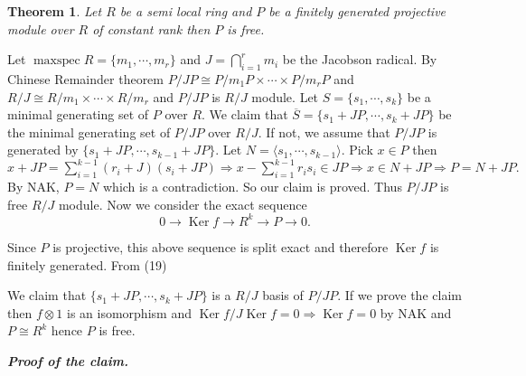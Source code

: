 \documentclass[11pt]{amsart}
\newtheorem{theorem}{Theorem}[section]
\newcommand\isom{\mathrel{\stackon[-0.1ex]{\makebox*{\scalebox{1.08}{\AC}}{=\hfill\llap{=}}}{{\AC}}}}
\newcommand\nvisom{\rotatebox[origin=cc] {-90}{$ \isom $}}
\newcommand{\gen}[1]{\langle#1\rangle}
\DeclareMathOperator{\Ker}{\text{Ker}}
\DeclareMathOperator{\mspec}{\text{maxspec}}
\begin{document}
\begin{theorem}

Let $R$ be a semi local ring and $P$ be a finitely generated projective module over $R$ of constant rank then $P$ is free.

\end{theorem}

\proof Let $\mspec R=\{m_1,\cdots, m_r\}$ and $J=\displaystyle\bigcap_{i=1}^r m_i$ be the Jacobson radical. By Chinese Remainder theorem $P/JP\cong P/m_1P\times\cdots\times P/m_rP$ and $R/J\cong R/m_1\times\cdots\times R/m_r$ and $P/JP$ is $R/J$ module. Let $S=\{s_1,\cdots,s_k\}$ be a minimal generating set of $P$ over $R$. We claim that $\overline{S}=\{s_1+JP,\cdots,s_k+JP\}$ be the minimal generating set of $P/JP$ over $R/J.$ If not, we assume that $P/JP$ is generated by $\{s_1+JP,\cdots,s_{k-1}+JP\}$. Let $N=\gen{s_1,\cdots,s_{k-1}}.$  Pick $x\in P$ then $x+JP=\displaystyle\sum_{i=1}^{k-1} (r_i+J)(s_i+JP) \Rightarrow x-\displaystyle\sum_{i=1}^{k-1} r_is_i\in JP \Rightarrow x\in N+JP \Rightarrow P=N+JP.$ By NAK, $P=N$ which is a contradiction. So our claim is proved. Thus $P/JP$ is free $R/J$ module. Now we consider the exact sequence \begin{equation}
0\to \Ker f\to R^k\to P\to 0.
\end{equation}

Since $P$ is projective, this above sequence is split exact and therefore $\Ker f$ is finitely generated. From (19) \begin{center}


\end{center}

We claim that $\{s_1+JP,\cdots,s_k+JP\}$ is a $R/J$ basis of $P/JP$. If we prove the claim then $f\otimes 1$ is an isomorphism and $\Ker f/J\Ker f=0 \Rightarrow \Ker f=0$ by NAK and $P\cong R^k$ hence $P$ is free. 

\textit{\textbf{Proof of the claim.}}
\end{document}
